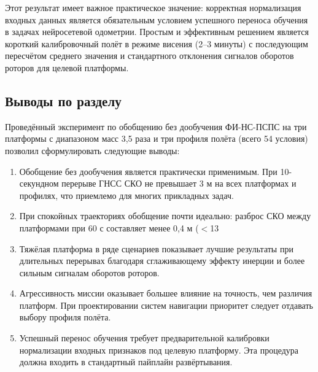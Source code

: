 Этот результат имеет важное практическое значение: корректная нормализация входных данных является обязательным условием успешного переноса обучения в задачах нейросетевой одометрии. Простым и эффективным решением является короткий калибровочный полёт в режиме висения (2--3 минуты) с последующим пересчётом среднего значения и стандартного отклонения сигналов оборотов роторов для целевой платформы.

\subsection{Выводы по разделу}

Проведённый эксперимент по обобщению без дообучения ФИ-НС-ПСПС на три платформы с диапазоном масс 3,5 раза и три профиля полёта (всего 54 условия) позволил сформулировать следующие выводы:

\begin{enumerate}
\item Обобщение без дообучения является практически применимым. При 10-секундном перерыве ГНСС СКО не превышает 3 м на всех платформах и профилях, что приемлемо для многих прикладных задач.

\item При спокойных траекториях обобщение почти идеально: разброс СКО между платформами при 60 с составляет менее 0,4 м ($<$13 %

\item Тяжёлая платформа в ряде сценариев показывает лучшие результаты при длительных перерывах благодаря сглаживающему эффекту инерции и более сильным сигналам оборотов роторов.

\item Агрессивность миссии оказывает большее влияние на точность, чем различия платформ. При проектировании систем навигации приоритет следует отдавать выбору профиля полёта.

\item Успешный перенос обучения требует предварительной калибровки нормализации входных признаков под целевую платформу. Эта процедура должна входить в стандартный пайплайн развёртывания.
\end{enumerate}

